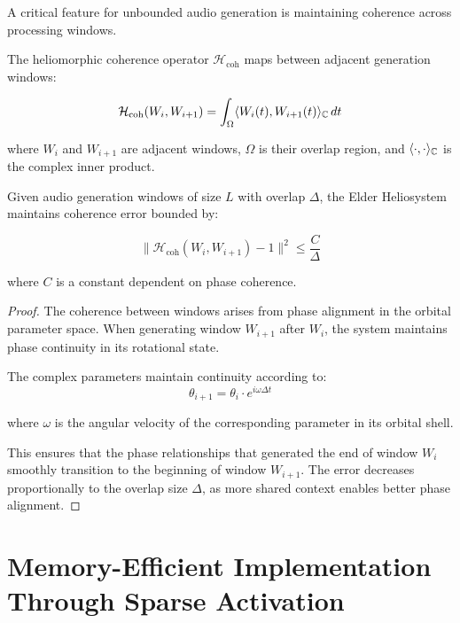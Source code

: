 A critical feature for unbounded audio generation is maintaining coherence across processing windows.

\begin{definition}
The heliomorphic coherence operator $\mathcal{H}_{\text{coh}}$ maps between adjacent generation windows:

\begin{equation}
\mathcal{H}_{\text{coh}}(W_i, W_{i+1}) = \int_{\Omega} \langle W_i(t), W_{i+1}(t) \rangle_{\mathbb{C}} \, dt
\end{equation}

where $W_i$ and $W_{i+1}$ are adjacent windows, $\Omega$ is their overlap region, and $\langle \cdot, \cdot \rangle_{\mathbb{C}}$ is the complex inner product.
\end{definition}

\begin{theorem}
Given audio generation windows of size $L$ with overlap $\Delta$, the Elder Heliosystem maintains coherence error bounded by:

\begin{equation}
\|\mathcal{H}_{\text{coh}}(W_i, W_{i+1}) - 1\|^2 \leq \frac{C}{\Delta}
\end{equation}

where $C$ is a constant dependent on phase coherence.
\end{theorem}

\begin{proof}
The coherence between windows arises from phase alignment in the orbital parameter space. When generating window $W_{i+1}$ after $W_i$, the system maintains phase continuity in its rotational state.

The complex parameters maintain continuity according to:
\begin{equation}
\theta_{i+1} = \theta_i \cdot e^{i\omega \Delta t}
\end{equation}

where $\omega$ is the angular velocity of the corresponding parameter in its orbital shell.

This ensures that the phase relationships that generated the end of window $W_i$ smoothly transition to the beginning of window $W_{i+1}$. The error decreases proportionally to the overlap size $\Delta$, as more shared context enables better phase alignment.
\end{proof}

\section{Memory-Efficient Implementation Through Sparse Activation}

